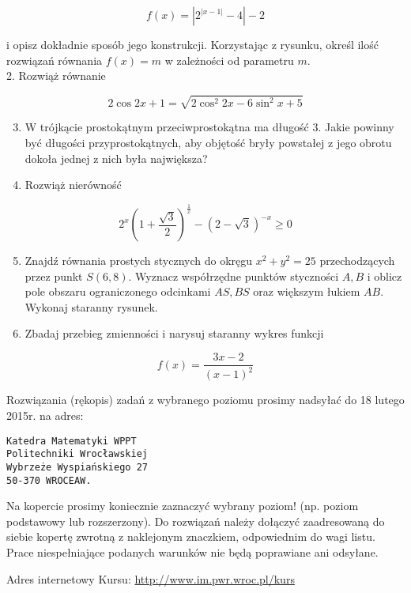 \documentclass[10pt]{article}
\begin{document}
$$
f(x)=\left|2^{|x-1|}-4\right|-2
$$

i opisz dokładnie sposób jego konstrukcji. Korzystając z rysunku, określ ilość rozwiązań równania $f(x)=m$ w zależności od parametru $m$.\\
2. Rozwiąż równanie

$$
2 \cos 2 x+1=\sqrt{2 \cos ^{2} 2 x-6 \sin ^{2} x+5}
$$

\begin{enumerate}
  \setcounter{enumi}{2}
  \item W trójkącie prostokątnym przeciwprostokątna ma długość 3. Jakie powinny być długości przyprostokątnych, aby objętość bryły powstałej z jego obrotu dokoła jednej z nich była największa?
  \item Rozwiąż nierówność
\end{enumerate}

$$
2^{x}\left(1+\frac{\sqrt{3}}{2}\right)^{\frac{1}{x}}-(2-\sqrt{3})^{-x} \geqslant 0
$$

\begin{enumerate}
  \setcounter{enumi}{4}
  \item Znajdź równania prostych stycznych do okręgu $x^{2}+y^{2}=25$ przechodzących przez punkt $S(6,8)$. Wyznacz współrzędne punktów styczności $A, B$ i oblicz pole obszaru ograniczonego odcinkami $A S, B S$ oraz większym łukiem $A B$. Wykonaj staranny rysunek.
  \item Zbadaj przebieg zmienności i narysuj staranny wykres funkcji
\end{enumerate}

$$
f(x)=\frac{3 x-2}{(x-1)^{2}}
$$

Rozwiązania (rękopis) zadań z wybranego poziomu prosimy nadsyłać do 18 lutego 2015r. na adres:

\begin{verbatim}
Katedra Matematyki WPPT
Politechniki Wrocławskiej
Wybrzeże Wyspiańskiego 27
50-370 WROCEAW.
\end{verbatim}

Na kopercie prosimy koniecznie zaznaczyć wybrany poziom! (np. poziom podstawowy lub rozszerzony). Do rozwiązań należy dołączyć zaadresowaną do siebie kopertę zwrotną z naklejonym znaczkiem, odpowiednim do wagi listu. Prace niespełniające podanych warunków nie będą poprawiane ani odsyłane.

Adres internetowy Kursu: \href{http://www.im.pwr.wroc.pl/kurs}{http://www.im.pwr.wroc.pl/kurs}
\end{document}
